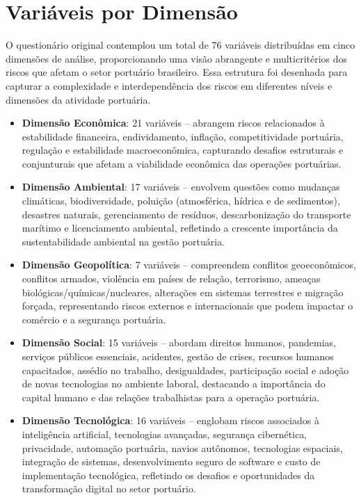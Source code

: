 \documentclass[
  portuguese,
  letterpaper,
  DIV=11,
  numbers=noendperiod]{scrreprt}
\begin{document}
\section{Variáveis por Dimensão}\label{variuxe1veis-por-dimensuxe3o}

O questionário original contemplou um total de 76 variáveis distribuídas
em cinco dimensões de análise, proporcionando uma visão abrangente e
multicritérios dos riscos que afetam o setor portuário brasileiro. Essa
estrutura foi desenhada para capturar a complexidade e interdependência
dos riscos em diferentes níveis e dimensões da atividade portuária.

\begin{itemize}
\item
  \textbf{Dimensão Econômica}: 21 variáveis -- abrangem riscos
  relacionados à estabilidade financeira, endividamento, inflação,
  competitividade portuária, regulação e estabilidade macroeconômica,
  capturando desafios estruturais e conjunturais que afetam a
  viabilidade econômica das operações portuárias.
\item
  \textbf{Dimensão Ambiental}: 17 variáveis -- envolvem questões como
  mudanças climáticas, biodiversidade, poluição (atmosférica, hídrica e
  de sedimentos), desastres naturais, gerenciamento de resíduos,
  descarbonização do transporte marítimo e licenciamento ambiental,
  refletindo a crescente importância da sustentabilidade ambiental na
  gestão portuária.
\item
  \textbf{Dimensão Geopolítica}: 7 variáveis -- compreendem conflitos
  geoeconômicos, conflitos armados, violência em países de relação,
  terrorismo, ameaças biológicas/químicas/nucleares, alterações em
  sistemas terrestres e migração forçada, representando riscos externos
  e internacionais que podem impactar o comércio e a segurança
  portuária.
\item
  \textbf{Dimensão Social}: 15 variáveis -- abordam direitos humanos,
  pandemias, serviços públicos essenciais, acidentes, gestão de crises,
  recursos humanos capacitados, assédio no trabalho, desigualdades,
  participação social e adoção de novas tecnologias no ambiente laboral,
  destacando a importância do capital humano e das relações trabalhistas
  para a operação portuária.
\item
  \textbf{Dimensão Tecnológica}: 16 variáveis -- englobam riscos
  associados à inteligência artificial, tecnologias avançadas, segurança
  cibernética, privacidade, automação portuária, navios autônomos,
  tecnologias espaciais, integração de sistemas, desenvolvimento seguro
  de software e custo de implementação tecnológica, refletindo os
  desafios e oportunidades da transformação digital no setor portuário.
\end{itemize}
\end{document}
